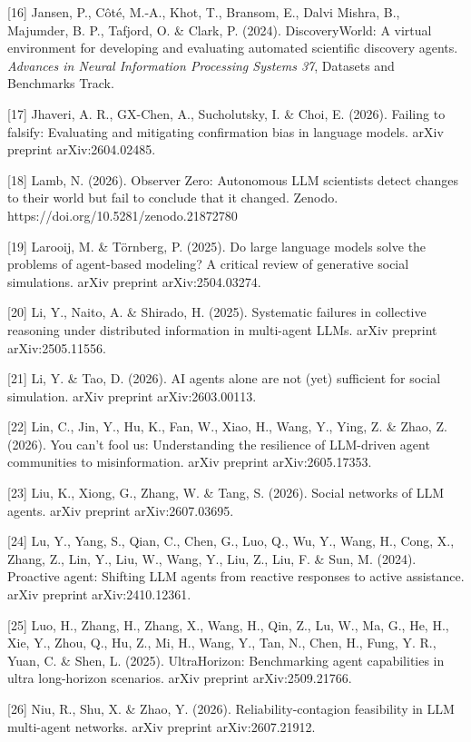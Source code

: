 \documentclass[pdflatex,sn-basic]{sn-jnl}
\begin{document}
{[}16{]} Jansen, P., Côté, M.-A., Khot, T., Bransom, E., Dalvi Mishra, B., Majumder, B. P., Tafjord, O. \& Clark, P. (2024). DiscoveryWorld: A virtual environment for developing and evaluating automated scientific discovery agents. \emph{Advances in Neural Information Processing Systems 37}, Datasets and Benchmarks Track.

{[}17{]} Jhaveri, A. R., GX-Chen, A., Sucholutsky, I. \& Choi, E. (2026). Failing to falsify: Evaluating and mitigating confirmation bias in language models. arXiv preprint arXiv:2604.02485.

{[}18{]} Lamb, N. (2026). Observer Zero: Autonomous LLM scientists detect changes to their world but fail to conclude that it changed. Zenodo. https://doi.org/10.5281/zenodo.21872780

{[}19{]} Larooij, M. \& Törnberg, P. (2025). Do large language models solve the problems of agent-based modeling? A critical review of generative social simulations. arXiv preprint arXiv:2504.03274.

{[}20{]} Li, Y., Naito, A. \& Shirado, H. (2025). Systematic failures in collective reasoning under distributed information in multi-agent LLMs. arXiv preprint arXiv:2505.11556.

{[}21{]} Li, Y. \& Tao, D. (2026). AI agents alone are not (yet) sufficient for social simulation. arXiv preprint arXiv:2603.00113.

{[}22{]} Lin, C., Jin, Y., Hu, K., Fan, W., Xiao, H., Wang, Y., Ying, Z. \& Zhao, Z. (2026). You can't fool us: Understanding the resilience of LLM-driven agent communities to misinformation. arXiv preprint arXiv:2605.17353.

{[}23{]} Liu, K., Xiong, G., Zhang, W. \& Tang, S. (2026). Social networks of LLM agents. arXiv preprint arXiv:2607.03695.

{[}24{]} Lu, Y., Yang, S., Qian, C., Chen, G., Luo, Q., Wu, Y., Wang, H., Cong, X., Zhang, Z., Lin, Y., Liu, W., Wang, Y., Liu, Z., Liu, F. \& Sun, M. (2024). Proactive agent: Shifting LLM agents from reactive responses to active assistance. arXiv preprint arXiv:2410.12361.

{[}25{]} Luo, H., Zhang, H., Zhang, X., Wang, H., Qin, Z., Lu, W., Ma, G., He, H., Xie, Y., Zhou, Q., Hu, Z., Mi, H., Wang, Y., Tan, N., Chen, H., Fung, Y. R., Yuan, C. \& Shen, L. (2025). UltraHorizon: Benchmarking agent capabilities in ultra long-horizon scenarios. arXiv preprint arXiv:2509.21766.

{[}26{]} Niu, R., Shu, X. \& Zhao, Y. (2026). Reliability-contagion feasibility in LLM multi-agent networks. arXiv preprint arXiv:2607.21912.
\end{document}
